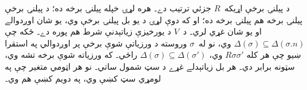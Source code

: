 \documentclass[../../../include/open-logic-section]{subfiles}
\begin{document}
د پيلنۍ برخې اړيکه~$R$ جزئي ترتيب دے۔ هره لړۍ خپله پيلنۍ
برخه ده؛ د پيلنۍ برخې پيلنۍ برخه هم پيلنۍ برخه ده؛ او که
دوې لړۍ د يو بل پيلنۍ برخې وي، يو شان اوږدوالے او يو شان غړي
لري۔ د~$V$ د يورخيزې زياتېدنې شرط هم پوره دے۔ ځکه چې $\Delta(\sigma)
\subseteq \Delta(\sigma.n)$ وي، نو له~$\sigma$ وروسته د ورزياتې
شوې برخې پر اوږدوالي په استقرا ښيو چې هر کله $R\sigma\sigma'$ وي،
$\Delta(\sigma)
\subseteq \Delta(\sigma')$ راځي۔ که ورزياته
شوې برخه تشه وي، سټونه برابر دي۔ هر بل زياتېدلے غړے د سټ
شمول ساتي۔ نو هر اټومي متغير چې په لومړي سټ کښې وي، په
دويم کښې هم وي۔
\end{document}

